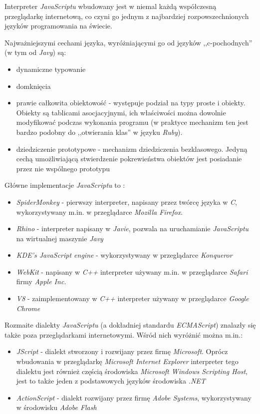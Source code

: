 \documentclass[a4paper,12pt]{article}
\begin{document}
Interpreter \emph{JavaScriptu} wbudowany jest w niemal każdą
współczesną przeglądarkę internetową, co czyni go jednym z najbardziej
rozpowszechnionych języków programowania na świecie.

Najważniejszymi cechami języka, wyróżniającymi go od języków
,,c-pochodnych'' (w tym od \emph{Javy}) są:

\begin{itemize}
\item dynamiczne typowanie
\item domknięcia
\item prawie całkowita obiektowość - występuje podział na typy proste
  i obiekty. Obiekty są tablicami asocjacyjnymi, ich właściwości można
  dowolnie modyfikować podczas wykonania programu (w praktyce
  mechanizm ten jest bardzo podobny do ,,otwierania klas'' w języku
  \emph{Ruby}).
\item dziedziczenie prototypowe - mechanizm dziedziczenia
  bezklasowego. Jedyną cechą umożliwiającą stwierdzenie pokrewieństwa
  obiektów jest posiadanie przez nie wspólnego prototypu
\end{itemize}

Główne implementacje \emph{JavaScriptu} to \cite{javascript}:

\begin{itemize}
\item \emph{SpiderMonkey} - pierwszy interpreter, napisany przez
  twórcę języka w \emph{C}, wykorzystywany m.in. w przeglądarce \emph{Mozilla
    Firefox}.
\item \emph{Rhino} - interpreter napisany w \emph{Javie}, pozwala na
  uruchamianie \emph{JavaScriptu} na wirtualnej maszynie \emph{Javy}
\item \emph{KDE's JavaScript engine} - wykorzystywany w przeglądarce
  \emph{Konqueror}
\item \emph{WebKit} - napisany w \emph{C++} interpreter używany
  m.in. w przeglądarce \emph{Safari} firmy \emph{Apple Inc.}
\item \emph{V8} - zaimplementowany w \emph{C++} interpreter używany w
  przeglądarce \emph{Google Chrome}
\end{itemize}

Rozmaite dialekty \emph{JavaScriptu} (a dokładniej standardu
\emph{ECMAScript}) znalazły się także poza przeglądarkami
internetowymi. Wśród nich wyróżnić można m.in.:

\begin{itemize}
\item \emph{JScript} - dialekt stworzony i rozwijany przez firmę
  \emph{Microsoft}. Oprócz wbudowania w przeglądarkę \emph{Microsoft
    Internet Explorer} interpreter tego dialektu jest również częścią
  środowiska \emph{Microsoft Windows Scripting Host}, jest to także
  jeden z podstawowych języków środowiska \emph{.NET}
\item \emph{ActionScript} - dialekt rozwijany przez firmę \emph{Adobe
    Systems}, wykorzystywany w środowisku \emph{Adobe Flash}
\end{itemize}
\end{document}
